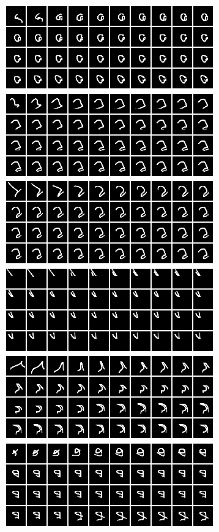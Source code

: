 \documentclass{article}
\begin{document}
\begin{figure}[htb!]
\centering
\includegraphics[scale=0.25]{../results/debug_recon/rand_init1_10.png}
\includegraphics[scale=0.25]{../results/debug_recon/rand_init3_10.png}
\includegraphics[scale=0.25]{../results/debug_recon/rand_init4_10.png}
\includegraphics[scale=0.25]{../results/debug_recon/rand_init5_10.png}
\includegraphics[scale=0.25]{../results/debug_recon/rand_init6_10.png}
\includegraphics[scale=0.25]{../results/debug_recon/rand_init7_10.png}

\end{figure}
\end{document}
